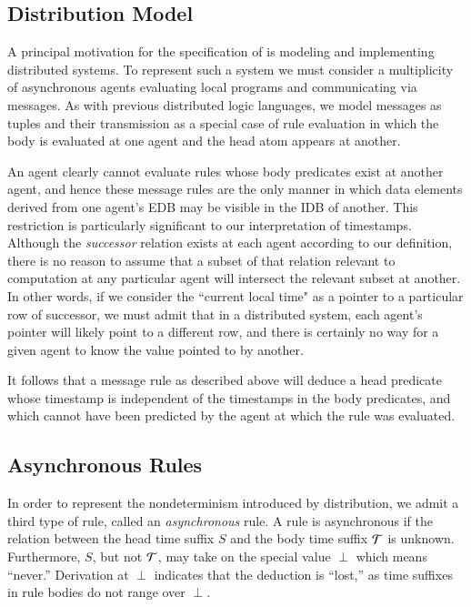 

\subsection{Distribution Model}

A principal motivation for the specification of \lang is modeling and implementing distributed systems.
To represent such a system we must consider a multiplicity of asynchronous agents evaluating local programs and
communicating via messages.  As with previous distributed logic languages, we model messages as
tuples and their transmission as a special case of rule evaluation in which the body is evaluated at one
agent and the head atom appears at another.  

An agent clearly cannot evaluate rules whose body
predicates exist at another agent, and hence these message rules are the only manner in which data
elements derived from one agent's EDB may be visible in the IDB of another.  This restriction is 
particularly significant to our interpretation of timestamps.  Although the \emph{successor} relation exists
at each agent according to our definition, there is no reason to assume that a subset of that relation 
relevant to computation at any particular agent will intersect the relevant subset at another.  In other words,
if we consider the ``current local time" as a pointer to a particular row of successor, we must admit that in a 
distributed system, each agent's pointer will likely point to a different row, and there is certainly no way for
a given agent to know the value pointed to by another.

It follows that a message rule as described above will deduce a head predicate whose timestamp is independent
of the timestamps in the body predicates, and which cannot have been predicted by the agent at which the rule
was evaluated.

\subsection{Asynchronous Rules}


In order to represent the nondeterminism introduced by distribution, we admit a
third type of rule, called an {\em asynchronous} rule.  A rule is asynchronous
if the 
relation between the head time suffix $S$ and the body time suffix $\Tau$ is
unknown.  Furthermore, $S$, but not $\Tau$, may take on the special value
$\perp$ which means ``never.''  Derivation at $\perp$ indicates that the
deduction is ``lost,'' as time suffixes in rule bodies do not range over
$\perp$.

